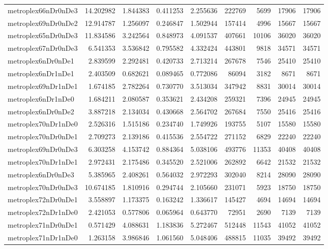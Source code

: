 \documentclass[../../../thesis.tex]{subfiles}
\begin{document}
\begin{longtable}{|l|r|r|r|r|r|r|r|r|}
metroplex66nDr0nDe3 & 14.202982 & 1.844383 & 0.411253 & 2.255636 & 222769 & 5699 & 17906 & 17906 \\
metroplex69nDr0nDe2 & 12.914787 & 1.256097 & 0.246847 & 1.502944 & 157414 & 4996 & 15667 & 15667 \\
metroplex65nDr0nDe3 & 11.834586 & 3.242564 & 0.848973 & 4.091537 & 407661 & 10106 & 36020 & 36020 \\
metroplex67nDr0nDe3 & 6.541353 & 3.536842 & 0.795582 & 4.332424 & 443801 & 9818 & 34571 & 34571 \\
metroplex6nDr0nDe1 & 2.839599 & 2.292481 & 0.420733 & 2.713214 & 267678 & 7546 & 25410 & 25410 \\
metroplex6nDr1nDe1 & 2.403509 & 0.682621 & 0.089465 & 0.772086 & 86094 & 3182 & 8671 & 8671 \\
metroplex69nDr1nDe1 & 1.674185 & 2.782264 & 0.730770 & 3.513034 & 347942 & 8831 & 30014 & 30014 \\
metroplex6nDr1nDe0 & 1.684211 & 2.080587 & 0.353621 & 2.434208 & 259321 & 7396 & 24945 & 24945 \\
metroplex6nDr0nDe2 & 3.887218 & 2.134034 & 0.430668 & 2.564702 & 267684 & 7550 & 25416 & 25416 \\
metroplex70nDr1nDe0 & 2.526316 & 1.515186 & 0.234740 & 1.749926 & 193755 & 5107 & 15580 & 15580 \\
metroplex70nDr0nDe1 & 2.709273 & 2.139186 & 0.415536 & 2.554722 & 271152 & 6829 & 22240 & 22240 \\
metroplex69nDr0nDe3 & 6.303258 & 4.153742 & 0.884364 & 5.038106 & 493776 & 11353 & 40408 & 40408 \\
metroplex70nDr1nDe1 & 2.972431 & 2.175486 & 0.345520 & 2.521006 & 262892 & 6642 & 21532 & 21532 \\
metroplex6nDr0nDe3 & 5.385965 & 2.408261 & 0.564032 & 2.972293 & 302040 & 8214 & 28090 & 28090 \\
metroplex70nDr0nDe3 & 10.674185 & 1.810916 & 0.294744 & 2.105660 & 231071 & 5923 & 18750 & 18750 \\
metroplex72nDr0nDe1 & 3.558897 & 1.173375 & 0.163242 & 1.336617 & 145427 & 4694 & 14694 & 14694 \\
metroplex72nDr1nDe0 & 2.421053 & 0.577806 & 0.065964 & 0.643770 & 72951 & 2690 & 7139 & 7139 \\
metroplex71nDr0nDe1 & 0.571429 & 4.088631 & 1.183836 & 5.272467 & 512448 & 11543 & 41052 & 41052 \\
metroplex71nDr1nDe0 & 1.263158 & 3.986846 & 1.061560 & 5.048406 & 488815 & 11035 & 39492 & 39492 \\

\end{longtable}
\end{document}
